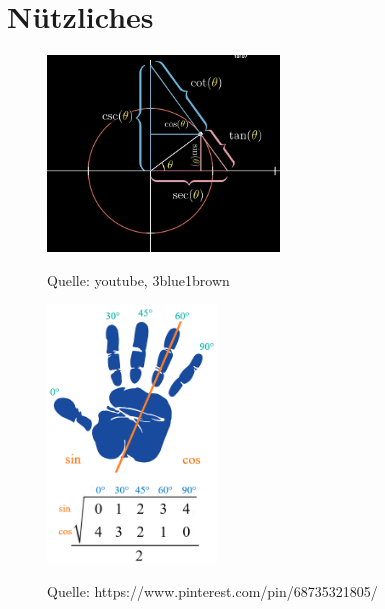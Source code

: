 \section{Nützliches}
\begin{figure}[H] 
\centering
    {\includegraphics[width=0.55\textwidth]{images/Einheitskreis.png}}
    \caption{Quelle: youtube, 3blue1brown}    
\end{figure}

\begin{figure}[H] 
\centering
    {\includegraphics[width=0.4\textwidth]{images/trigohands.png}}
    \caption{Quelle: https://www.pinterest.com/pin/68735321805/} 
\end{figure}


